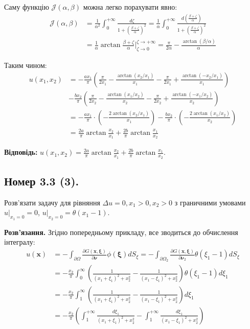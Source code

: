 \documentclass{hw_template}
\begin{document}
Саму функцію $\mathcal{J}(\alpha,\beta)$ можна легко порахувати явно:
\begin{align*}
    \mathcal{J}(\alpha,\beta) &= \frac{1}{\alpha^2}\int_0^{+\infty} \frac{d\zeta}{1 + \left(\frac{\beta + \zeta}{\alpha}\right)^2} = \frac{1}{\alpha}\int_0^{+\infty} \frac{d\left(\frac{\beta + \zeta}{\alpha}\right)}{1 + \left(\frac{\beta + \zeta}{\alpha}\right)^2} \\
    &= \frac{1}{\alpha}\arctan \frac{\beta+\zeta}{\alpha}\Big|_{\zeta \to 0}^{\zeta \to +\infty} = \frac{\pi}{2\alpha} - \frac{\arctan (\beta/\alpha)}{\alpha}
\end{align*}

Таким чином:
\begin{align*}
    u(x_1,x_2) &= -\frac{ax_1}{\pi}\left(\frac{\pi}{2x_1} - \frac{\arctan(x_2/x_1)}{x_1} - \frac{\pi}{2x_1} + \frac{\arctan(-x_2/x_1)}{x_1}\right) \\
    &- \frac{bx_2}{\pi}\left(\frac{\pi}{2x_2} - \frac{\arctan(x_1/x_2)}{x_2} - \frac{\pi}{2x_2} + \frac{\arctan(-x_1/x_2)}{x_2}\right) \\
    &= -\frac{ax_1}{\pi} \cdot \left(-\frac{2\arctan (x_2/x_1)}{x_1}\right) - \frac{bx_2}{\pi} \cdot \left(-\frac{2\arctan (x_1/x_2)}{x_2}\right) \\
    &= \frac{2a}{\pi}\arctan \frac{x_2}{x_1} + \frac{2b}{\pi}\arctan \frac{x_1}{x_2}
\end{align*}

\textbf{Відповідь:} $u(x_1,x_2) = \frac{2a}{\pi}\arctan \frac{x_2}{x_1} + \frac{2b}{\pi}\arctan \frac{x_1}{x_2}$.

\newpage

\subsection{Номер 3.3 (3).}

\begin{problem}
    Розв'язати задачу для рівняння $\Delta u = 0, x_1 > 0, x_2 > 0$ з граничними
    умовами $u\Big|_{x_1=0} = 0$, $u\Big|_{x_2 = 0} = \theta(x_1-1)$.
\end{problem}

\textbf{Розв'язання.} Згідно попередньому прикладу, все зводиться до обчислення інтегралу:
\begin{align*}
    u(\mathbf{x}) &= -\int_{\partial\Omega} \frac{\partial G(\mathbf{x}, \boldsymbol{\xi})}{\partial \boldsymbol{\nu}}\phi(\boldsymbol{\xi})dS_{\xi} = -\int_{\partial\Omega_2} \frac{\partial G(\mathbf{x}, \boldsymbol{\xi})}{\partial \boldsymbol{\nu}_2}\theta(\xi_1-1)dS_{\xi} \\
    &= -\frac{x_2}{\pi}\int_{0}^{\infty} \left(\frac{1}{(x_1+\xi_1)^2+x_2^2} - \frac{1}{(x_1-\xi_1)^2+x_2^2}\right)\theta(\xi_1-1)d\xi_1 \\
    &= -\frac{x_2}{\pi}\int_{1}^{\infty} \left(\frac{1}{(x_1+\xi_1)^2+x_2^2} - \frac{1}{(x_1-\xi_1)^2+x_2^2}\right)d\xi_1 \\
    &= -\frac{x_2}{\pi}\left(\int_1^{+\infty} \frac{d\xi_1}{(x_1+\xi_1)^2+x_2^2} - \int_1^{+\infty} \frac{d\xi_1}{(x_1-\xi_1)^2+x_2^2}\right)
\end{align*}
\end{document}
